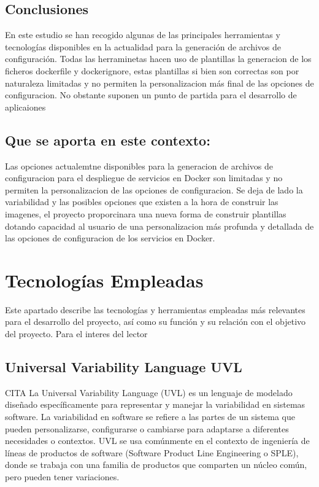 \documentclass[12pt, a4paper, twoside]{article}
\begin{document}
\subsection{Conclusiones}
En este estudio se han recogido algunas de las principales herramientas y tecnologías disponibles en la actualidad para la generación de archivos de configuración.
Todas las herraminetas hacen uso de plantillas la generacion de los ficheros dockerfile y dockerignore, estas plantillas si bien son correctas son por naturaleza limitadas y no permiten la personalizacion más final de las opciones de configuracion.
No obstante suponen un punto de partida para el desarrollo de aplicaiones 

\subsection{Que se aporta en este contexto:}
Las opciones actualemtne disponibles para la generacion de archivos de configuracion para el despliegue de servicios en Docker son limitadas y no permiten la personalizacion de las opciones de configuracion.
Se deja de lado la variabilidad y las posibles opciones que existen a la hora de construir las imagenes, el proyecto proporcinara una nueva forma de construir plantillas dotando capacidad al usuario de una personalizacion
más profunda y detallada de las opciones de configuracion de los servicios en Docker.















\section{Tecnologías Empleadas}
Este apartado describe las tecnologías y herramientas empleadas más relevantes para el desarrollo del proyecto, así como su función y su relación con el objetivo del proyecto.
Para el interes del lector 

\subsection{Universal Variability Language UVL}
CITA 
La Universal Variability Language (UVL) es un lenguaje de modelado diseñado específicamente para representar y manejar la variabilidad en sistemas software. 
La variabilidad en software se refiere a las partes de un sistema que pueden personalizarse, configurarse o cambiarse para adaptarse a diferentes necesidades o contextos. 
UVL se usa comúnmente en el contexto de ingeniería de líneas de productos de software (Software Product Line Engineering o SPLE), donde se trabaja con una familia de productos que comparten un núcleo común, pero pueden tener variaciones.
\end{document}
